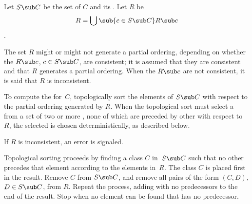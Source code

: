 Let $S\sub C$ be the set of $C$ and its . Let $R$ be
$$R=\bigcup\sub{c\in {S\sub C}}R\sub c$$.


The set $R$ might or might not generate a partial ordering, depending on
whether the $R\sub c$, $c\in S\sub C$, are 
consistent; it is assumed
that they are consistent and that $R$ generates a partial ordering.
When the $R\sub c$ are not consistent, it is said that $R$ is inconsistent.

%

To compute the  for~$C$\negthinspace,
topologically sort the elements of $S\sub C$ with respect to the
partial ordering generated by $R$\negthinspace.  When the topological
sort must select a  from a set of two or more 
, none of
which are preceded by other  with respect to~$R$\negthinspace,
the  selected is chosen deterministically, as described below.

If $R$ is inconsistent, an error is signaled.


\goodbreak



Topological sorting proceeds by finding a class $C$ in~$S\sub C$ such
that no other  precedes that element according to the elements
in~$R$\negthinspace.  The class $C$ is placed first in the result.
Remove $C$ from $S\sub C$, and remove all pairs of the form $(C,D)$,
$D\in S\sub C$, from $R$\negthinspace. Repeat the process, adding
 with no predecessors to the end of the result.  Stop when no
element can be found that has no predecessor.

